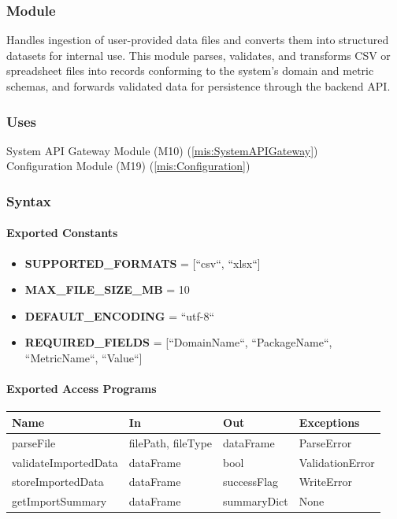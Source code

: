 \documentclass[12pt, titlepage]{article}
\begin{document}
\subsubsection{Module}
Handles ingestion of user-provided data files and converts them into structured
datasets for internal use. This module parses, validates, and transforms CSV or
spreadsheet files into records conforming to the system's domain and metric
schemas, and forwards validated data for persistence through the backend API.

\subsubsection{Uses}
System API Gateway Module (M10)  (\ref{mis:SystemAPIGateway})\\
Configuration Module (M19) (\ref{mis:Configuration})\\

\subsubsection{Syntax}

\paragraph{Exported Constants}
\begin{itemize}
  \item \textbf{SUPPORTED\_FORMATS} = [``csv``, ``xlsx``]
  \item \textbf{MAX\_FILE\_SIZE\_MB} = 10
  \item \textbf{DEFAULT\_ENCODING} = ``utf-8``
  \item \textbf{REQUIRED\_FIELDS} = [``DomainName``, ``PackageName``, ``MetricName``, ``Value``]
\end{itemize}

\paragraph{Exported Access Programs}
\begin{center}
\renewcommand{\arraystretch}{1.2}
\begin{tabularx}{\textwidth}{l X X l}
\toprule
\textbf{Name} & \textbf{In} & \textbf{Out} & \textbf{Exceptions}\\
\midrule
parseFile & filePath, fileType & dataFrame & ParseError \\
validateImportedData & dataFrame & bool & ValidationError \\
storeImportedData & dataFrame & successFlag & WriteError \\
getImportSummary & dataFrame & summaryDict & None \\
\bottomrule
\end{tabularx}
\end{center}
\end{document}
